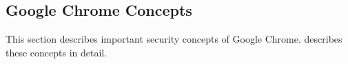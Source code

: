 \subsection{Google Chrome Concepts}
This section describes important security concepts of Google Chrome. \cite{chromium_security_architecture} describes these concepts in detail.



